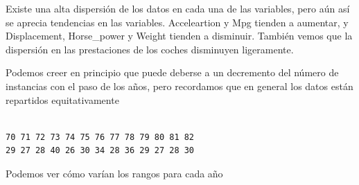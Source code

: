 \documentclass[
]{article}
\newenvironment{Shaded}{\begin{snugshade}}{\end{snugshade}}
\newcommand{\ControlFlowTok}[1]{\textcolor[rgb]{0.13,0.29,0.53}{\textbf{#1}}}
\newcommand{\DecValTok}[1]{\textcolor[rgb]{0.00,0.00,0.81}{#1}}
\newcommand{\KeywordTok}[1]{\textcolor[rgb]{0.13,0.29,0.53}{\textbf{#1}}}
\newcommand{\NormalTok}[1]{#1}
\newcommand{\OperatorTok}[1]{\textcolor[rgb]{0.81,0.36,0.00}{\textbf{#1}}}
\newcommand{\StringTok}[1]{\textcolor[rgb]{0.31,0.60,0.02}{#1}}
\begin{document}
Existe una alta dispersión de los datos en cada una de las variables,
pero aún así se aprecia tendencias en las variables. Acceleartion y Mpg
tienden a aumentar, y Displacement, Horse\_power y Weight tienden a
disminuir. También vemos que la dispersión en las prestaciones de los
coches disminuyen ligeramente.

Podemos creer en principio que puede deberse a un decremento del número
de instancias con el paso de los años, pero recordamos que en general
los datos están repartidos equitativamente

\begin{Shaded}
\end{Shaded}

\begin{verbatim}

70 71 72 73 74 75 76 77 78 79 80 81 82 
29 27 28 40 26 30 34 28 36 29 27 28 30 
\end{verbatim}

Podemos ver cómo varían los rangos para cada año

\begin{Shaded}
\end{Shaded}
\end{document}

